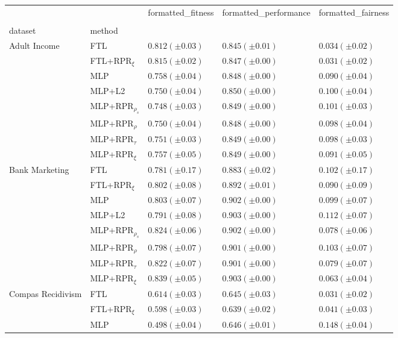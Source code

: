 \begin{tabular}{lllll}
\toprule
 &  & formatted_fitness & formatted_performance & formatted_fairness \\
 &  &  &  &  \\
dataset & method &  &  &  \\
\midrule
\multirow[t]{8}{*}{Adult Income} & FTL & $0.812 (\pm0.03)$ & $0.845 (\pm0.01)$ & $0.034 (\pm0.02)$ \\
 & FTL+RPR$_{\xi}$ & $0.815 (\pm0.02)$ & $0.847 (\pm0.00)$ & $0.031 (\pm0.02)$ \\
 & MLP & $0.758 (\pm0.04)$ & $0.848 (\pm0.00)$ & $0.090 (\pm0.04)$ \\
 & MLP+L2 & $0.750 (\pm0.04)$ & $0.850 (\pm0.00)$ & $0.100 (\pm0.04)$ \\
 & MLP+RPR$_{\rho_s}$ & $0.748 (\pm0.03)$ & $0.849 (\pm0.00)$ & $0.101 (\pm0.03)$ \\
 & MLP+RPR$_{\rho}$ & $0.750 (\pm0.04)$ & $0.848 (\pm0.00)$ & $0.098 (\pm0.04)$ \\
 & MLP+RPR$_{\tau}$ & $0.751 (\pm0.03)$ & $0.849 (\pm0.00)$ & $0.098 (\pm0.03)$ \\
 & MLP+RPR$_{\xi}$ & $0.757 (\pm0.05)$ & $0.849 (\pm0.00)$ & $0.091 (\pm0.05)$ \\
\cline{1-5}
\multirow[t]{8}{*}{Bank Marketing} & FTL & $0.781 (\pm0.17)$ & $0.883 (\pm0.02)$ & $0.102 (\pm0.17)$ \\
 & FTL+RPR$_{\xi}$ & $0.802 (\pm0.08)$ & $0.892 (\pm0.01)$ & $0.090 (\pm0.09)$ \\
 & MLP & $0.803 (\pm0.07)$ & $0.902 (\pm0.00)$ & $0.099 (\pm0.07)$ \\
 & MLP+L2 & $0.791 (\pm0.08)$ & $0.903 (\pm0.00)$ & $0.112 (\pm0.07)$ \\
 & MLP+RPR$_{\rho_s}$ & $0.824 (\pm0.06)$ & $0.902 (\pm0.00)$ & $0.078 (\pm0.06)$ \\
 & MLP+RPR$_{\rho}$ & $0.798 (\pm0.07)$ & $0.901 (\pm0.00)$ & $0.103 (\pm0.07)$ \\
 & MLP+RPR$_{\tau}$ & $0.822 (\pm0.07)$ & $0.901 (\pm0.00)$ & $0.079 (\pm0.07)$ \\
 & MLP+RPR$_{\xi}$ & $0.839 (\pm0.05)$ & $0.903 (\pm0.00)$ & $0.063 (\pm0.04)$ \\
\cline{1-5}
\multirow[t]{8}{*}{Compas Recidivism} & FTL & $0.614 (\pm0.03)$ & $0.645 (\pm0.03)$ & $0.031 (\pm0.02)$ \\
 & FTL+RPR$_{\xi}$ & $0.598 (\pm0.03)$ & $0.639 (\pm0.02)$ & $0.041 (\pm0.03)$ \\
 & MLP & $0.498 (\pm0.04)$ & $0.646 (\pm0.01)$ & $0.148 (\pm0.04)$ \\

\end{tabular}
